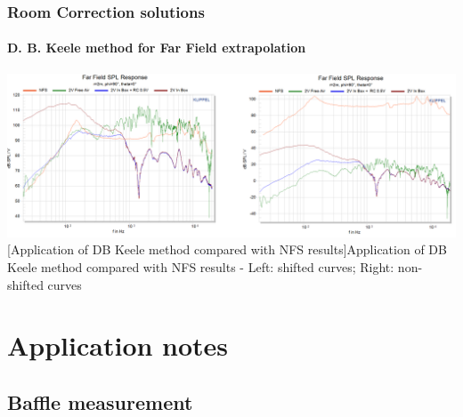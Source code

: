 \documentclass{report}
\begin{document}
\begin{appendices}
\subsection{Room Correction solutions}

\subsubsection{D. B. Keele method for Far Field extrapolation}
\label{Curves:dbkFF}

\begin{center}
	\includegraphics[width=\textwidth]{Appendix/DKeele_FF_All} 
    \captionsetup{hypcap=false} 
	[Application of DB Keele method compared with NFS results]{Application of DB Keele method compared with NFS results - Left: shifted curves; Right: non-shifted curves} 
	\label{fig:dbk_fig}
\end{center}




\chapter{Application notes}

\section{Baffle measurement}
\label{chap:AN_Baffle}

\end{appendices}
\end{document}
